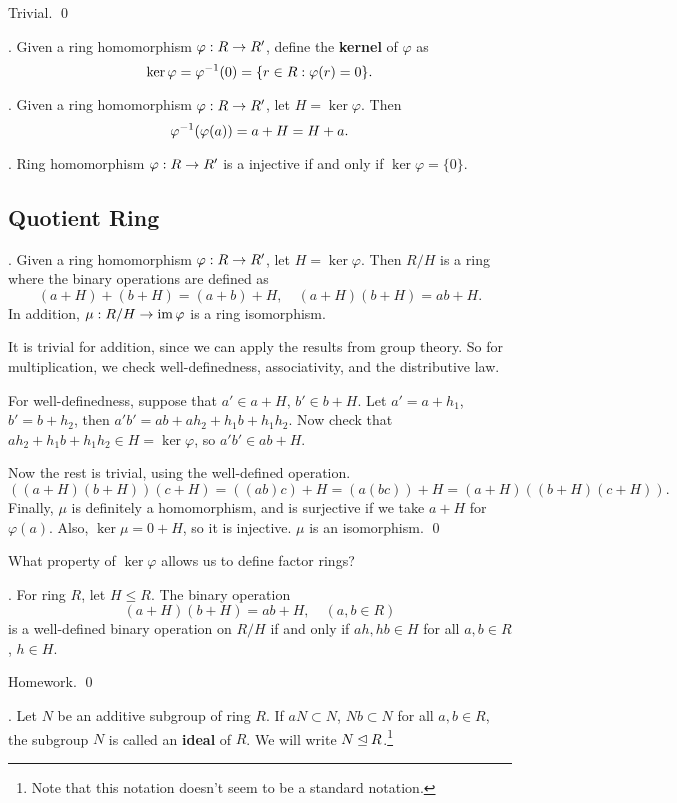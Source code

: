 \pf Trivial. \qed

.  Given a ring homomorphism \(\varphi : R \rightarrow R'\), define the \textbf{kernel} of \(\varphi\) as
\[
    \ker \varphi = \varphi^{-1}(0) = \{r \in R : \varphi(r) = 0\}.
\]

\thm. Given a ring homomorphism \(\varphi : R \rightarrow R'\), let \(H = \ker\varphi\). Then
\[
    \varphi^{-1}(\varphi(a)) = a + H = H + a.
\]

\cor. Ring homomorphism \(\varphi : R \rightarrow R'\) is a injective if and only if \(\ker\varphi = \{0\}\).

\pagebreak

\subsection*{Quotient Ring}

\thm. Given a ring homomorphism \(\varphi : R \rightarrow R'\), let \(H = \ker \varphi\). Then \(R / H\) is a ring where the binary operations are defined as
\[
    (a + H) + (b + H) = (a + b) + H, \quad (a + H)(b + H) = ab + H.
\]
In addition, \(\mu : R/H \rightarrow \operatorname{im} \varphi\) is a ring isomorphism.

\pf It is trivial for addition, since we can apply the results from group theory. So for multiplication, we check well-definedness, associativity, and the distributive law.

For well-definedness, suppose that \(a' \in a + H\), \(b' \in b + H\). Let \(a' = a + h_1\), \(b' = b + h_2\), then \(a'b' = ab + ah_2 + h_1b + h_1h_2\). Now check that \(ah_2 + h_1b + h_1h_2 \in H = \ker\varphi\), so \(a'b' \in ab + H\).

Now the rest is trivial, using the well-defined operation.
\[
    ((a + H)(b + H))(c + H) = ((ab)c) + H = (a(bc)) + H = (a + H)((b + H)(c + H)).
\]
Finally, \(\mu\) is definitely a homomorphism, and is surjective if we take \(a + H\) for \(\varphi(a)\). Also, \(\ker \mu = 0 + H\), so it is injective. \(\mu\) is an isomorphism. \qed

What property of \(\ker \varphi\) allows us to define factor rings?

\thm. For ring \(R\), let \(H \leq R\). The binary operation
\[
    (a + H)(b + H) = ab + H, \quad (a, b \in R)
\]
is a well-defined binary operation on \(R/H\) if and only if \(ah, hb \in H\) for all \(a, b \in R\), \(h \in H\).

\pf Homework. \qed

\pagebreak

.  Let \(N\) be an additive subgroup of ring \(R\). If \(aN \subset N\), \(Nb \subset N\) for all \(a, b \in R\), the subgroup \(N\) is called an \textbf{ideal} of \(R\). We will write \(N \unlhd R\).\footnote{Note that this notation doesn't seem to be a standard notation.}

